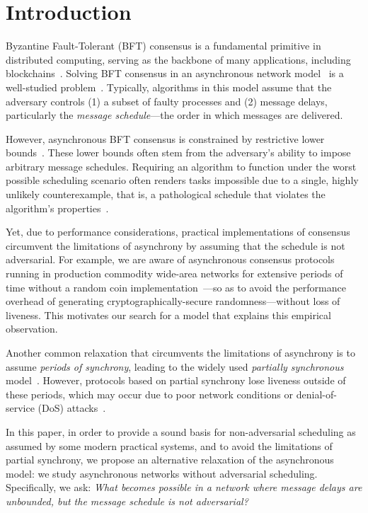 \section{Introduction}\label{sec:intro}


Byzantine Fault-Tolerant (BFT) consensus is a fundamental primitive in distributed computing, serving as the backbone of many applications, including blockchains~\cite{sok-consensus}. Solving BFT consensus in an asynchronous network model~\cite{FLP} is a well-studied problem~\cite{book,dag-rider,ren2017,mahimahi}. Typically, algorithms in this model assume that the adversary controls (1) a subset of faulty processes and (2) message delays, particularly the \textit{message schedule}—the order in which messages are delivered.


However, asynchronous BFT consensus is constrained by restrictive lower bounds~\cite{FLP, byz-generals}. These lower bounds often stem from the adversary's ability to impose arbitrary message schedules. Requiring an algorithm to function under the worst possible scheduling scenario often renders tasks impossible due to a single, highly unlikely counterexample, that is, a pathological schedule that violates the algorithm's properties~\cite{FLP}.

Yet, due to performance considerations, practical implementations of consensus circumvent the limitations of asynchrony by assuming that the schedule is not adversarial. For example, we are aware of asynchronous consensus protocols running in production commodity wide-area networks for extensive periods of time without a random coin implementation~\cite{narwhal}---so as to avoid the performance overhead of generating cryptographically-secure randomness---without loss of liveness. This motivates our search for a model that explains this empirical observation.

Another common relaxation that circumvents the limitations of asynchrony is to assume \textit{periods of synchrony}, leading to the widely used \textit{partially synchronous} model~\cite{dwork1988consensus}. However, protocols based on partial synchrony lose liveness outside of these periods, which may occur due to poor network conditions or denial-of-service (DoS) attacks~\cite{consensus-dos}.

In this paper, in order to provide a sound basis for non-adversarial scheduling as assumed by some modern practical systems, and to avoid the limitations of partial synchrony, we propose an alternative relaxation of the asynchronous model: we study asynchronous networks without adversarial scheduling. Specifically, we ask:
\textit{What becomes possible in a network where message delays are unbounded, but the message schedule is not adversarial?}

